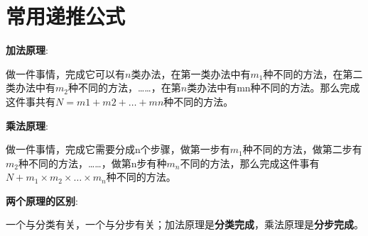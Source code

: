 \documentclass{article}
\begin{document}
\section{常用递推公式}

\textbf{加法原理}:

做一件事情，完成它可以有$n$类办法，在第一类办法中有$m_1$种不同的方法，在第二类办法中有$m_2$种不同的方法，……，在第$n$类办法中有mn种不同的方法。那么完成这件事共有$N=m1+m2+…+mn$种不同的方法。

\textbf{乘法原理}:

做一件事情，完成它需要分成n个步骤，做第一步有$m_1$种不同的方法，做第二步有$m_2$种不同的方法，……，做第n步有种$m_n$不同的方法，那么完成这件事有$N+m_1 \times m_2 \times … \times m_n$种不同的方法。

\textbf{两个原理的区别}:

一个与分类有关，一个与分步有关；加法原理是\textbf{分类完成}，乘法原理是\textbf{分步完成}。
\end{document}
